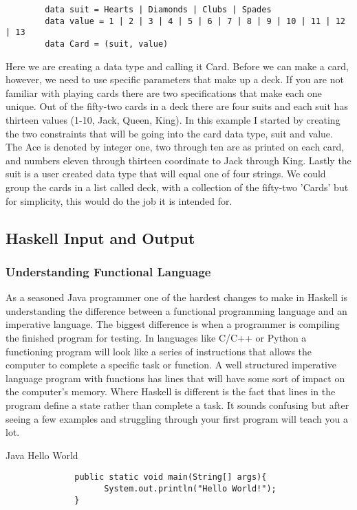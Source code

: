 \documentclass{article}
\begin{document}
    \begin{lstlisting}
        data suit = Hearts | Diamonds | Clubs | Spades 
        data value = 1 | 2 | 3 | 4 | 5 | 6 | 7 | 8 | 9 | 10 | 11 | 12 | 13  
        data Card = (suit, value)
    \end{lstlisting}
    
    Here we are creating a data type and calling it Card. Before we can make a card, however, we need to use specific parameters that make up a deck. If you are not familiar with playing cards there are two specifications that make each one unique. Out of the fifty-two cards in a deck there are four suits and each suit has thirteen values (1-10, Jack, Queen, King). In this example I started by creating the two constraints that will be going into the card data type, suit and value. The Ace is denoted by integer one, two through ten are as printed on each card, and numbers eleven through thirteen coordinate to Jack through King. Lastly the suit is a user created data type that will equal one of four strings. We could group the cards in a list called deck, with a collection of the fifty-two 'Cards' but for simplicity, this would do the job it is intended for.
    
\subsection{Haskell Input and Output }
    \subsubsection{Understanding Functional Language}
    As a seasoned Java programmer one of the hardest changes to make in Haskell is understanding the difference between a functional programming language and an imperative language. The biggest difference is when a programmer is compiling the finished program for testing. In languages like C/C++ or Python a functioning program will look like a series of instructions that allows the computer to complete a specific task or function. A well structured imperative language program with functions has lines that will have some sort of impact on the computer's memory. Where Haskell is different is the fact that lines in the program define a state rather than complete a task. It sounds confusing but after seeing a few examples and struggling through your first program will teach you a lot. 
    
    \medskip
    \caption{Java Hello World}
    \begin{lstlisting}
              public static void main(String[] args){
                    System.out.println("Hello World!");
              }
    \end{lstlisting}
    
\end{document}
